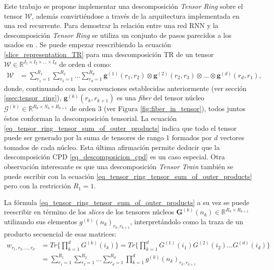 \documentclass[spanish]{article}
\theoremstyle{definition}
\theoremstyle{remark}
\numberwithin{equation}{section}
\numberwithin{equation}{section} %
\begin{document}
Este trabajo se propone implementar una descomposición \textit{Tensor Ring} sobre el tensor $\mathcal{W}$, además convirtiéndose a través de la arquitectura implementada en una red recurrente.
Para demostrar la relación entre una red RNN y la descomposición \textit{Tensor Ring} se utiliza un conjunto de pasos parecidos a los usados en \cite{khrulkov2017expressive,cohen2016expressive,stoudenmire2016supervised}. Se puede empezar reescribiendo la ecuación \eqref{slice_representation_TR} para una descomposición TR de un tensor $\mathcal{W} \in \mathbb{R}^{I_1 \times I_2 \times \ldots \times I_d }$ de orden d como:
\begin{equation}
\label{eq_tensor_ring_tensor_sum_of_outer_products}
\begin{split}
\mathcal{W}&
=\sum^{R_1}_{r_1=1}\sum^{R_2}_{r_2=1}\ldots\sum^{R_d}_{r_d=1} \boldsymbol{g}^{(1)}(r_1,r_2) \otimes \boldsymbol{g}^{(2)}(r_2,r_3) \otimes \dots  \otimes \boldsymbol{g}^{(d)}(r_d,r_1),
\end{split}
\end{equation}
donde, continuando con las convenciones establecidas anteriormente (ver sección \ref{ssec:tensor_ring}), $\boldsymbol{g}^{(k)}(r_k,r_{k+1})$ es una \textit{fiber} del tensor núcleo 
$\mathcal{G}^{(k)} \in \mathbb{R}^{R_k \times N_k \times R_{k+1}}$ de orden 3 (ver Figura \ref{fig:fiber_in_tensor}), todos juntos éstos conforman la descomposición tensorial. La ecuación \eqref{eq_tensor_ring_tensor_sum_of_outer_products} indica que todo el tensor  puede ser generado por la suma de tensores de rango 1 formados por $d$ vectores tomados de cada núcleo. Esta última afirmación permite deducir que la descomposición CPD \eqref{eq_descomposicion_cpd} es un caso especial. Otra observación interesante es que una descomposición \textit{Tensor Train} también se puede escribir con la ecuación \eqref{eq_tensor_ring_tensor_sum_of_outer_products} pero con la restricción $R_1=1$.
\par

La fórmula \eqref{eq_tensor_ring_tensor_sum_of_outer_products} a su vez se puede reescribir en término de los \textit{slices} de los tensores núcleos $\boldsymbol{G}^{(k)}(n_k) \in \mathbb{R}^{R_k \times R_{k+1}}$ utilizando sus elementos $g^{(k)}(n_k)_{r_k,r_{k+1}}$, interpretándolo como la traza de un producto secuencial de esas matrices:
\begin{equation}
\label{eq_tensor_ring_tensor_sum_of_products}
\begin{split}
w_{r_1,r_2,...,r_d}&
=Tr\{ \prod^d_{k=1} G^{(k)}(i_k) \} = Tr\{ \prod^d_{k=1} G^{(1)}(i_1) G^{(2)}(i_2) \ldots  G^{(d)}(i_d) \} \\ &
=\sum^{R_1}_{r_1=1}\sum^{R_2}_{r_2=1}\ldots\sum^{R_d}_{r_d=1}  \prod^d_{k=1} g^{(k)}(n_k)_{r_k,r_{k+1}}
\end{split}
\end{equation}\par
\end{document}
